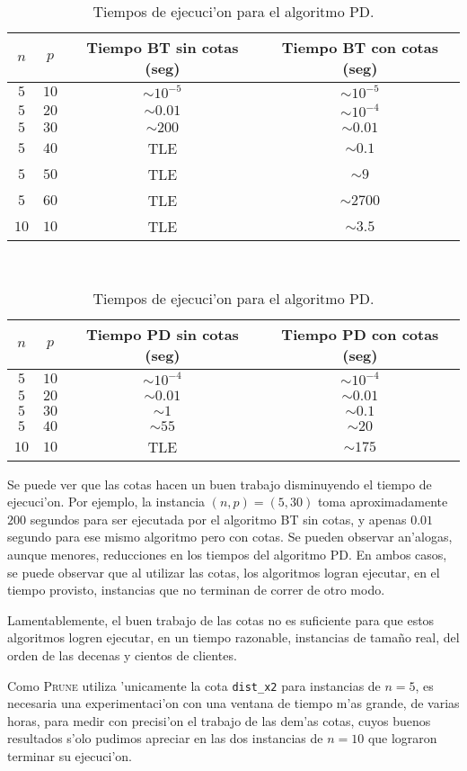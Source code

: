\begin{table}[h]
\centering
\begin{tabular}{|c|c|c|c|}
\hline
$n$ & $p$ & Tiempo BT sin cotas (seg) & Tiempo BT con cotas (seg)\\
\hline
$5$ & $10$ & $\sim 10^{-5}$ & $\sim 10^{-5}$\\
$5$ & $20$ & $\sim 0.01$ & $\sim 10^{-4}$\\
$5$ & $30$ & $\sim 200$ & $\sim 0.01$\\
$5$ & $40$ & TLE & $\sim 0.1$\\
$5$ & $50$ & TLE & $\sim 9$\\
$5$ & $60$ & TLE & $\sim 2700$\\
$10$ & $10$ & TLE & $\sim 3.5$\\
\hline
\end{tabular}
\caption{Tiempos de ejecuci'on para el algoritmo BT.}
\label{ta:tiempos_bt}
\hfill \\
\begin{tabular}{|c|c|c|c|}
\hline
$n$ & $p$ & Tiempo PD sin cotas (seg) & Tiempo PD con cotas (seg)\\
\hline
$5$ & $10$ & $\sim 10^{-4}$ & $\sim 10^{-4}$\\
$5$ & $20$ & $\sim 0.01$ & $\sim 0.01$\\
$5$ & $30$ & $\sim 1$ & $\sim 0.1$\\
$5$ & $40$ & $\sim 55$ & $\sim 20$\\
$10$ & $10$ & TLE & $\sim 175$\\
\hline
\end{tabular}
\caption{Tiempos de ejecuci'on para el algoritmo PD.}
\label{ta:tiempos_dp}
\end{table}

Se puede ver que las cotas hacen un buen trabajo disminuyendo el tiempo de ejecuci'on. Por ejemplo, la instancia $(n, p) = (5, 30)$ toma aproximadamente $200$ segundos para ser ejecutada por el algoritmo BT sin cotas, y apenas $0.01$ segundo para ese mismo algoritmo pero con cotas. Se pueden observar an'alogas, aunque menores, reducciones en los tiempos del algoritmo PD. En ambos casos, se puede observar que al utilizar las cotas, los algoritmos logran ejecutar, en el tiempo provisto, instancias que no terminan de correr de otro modo.

Lamentablemente, el buen trabajo de las cotas no es suficiente para que estos algoritmos logren ejecutar, en un tiempo razonable, instancias de tama\~no real, del orden de las decenas y cientos de clientes.

Como \textsc{Prune} utiliza 'unicamente la cota \texttt{dist\_x2} para instancias de $n = 5$, es necesaria una experimentaci'on con una ventana de tiempo m'as grande, de varias horas, para medir con precisi'on el trabajo de las dem'as cotas, cuyos buenos resultados s'olo pudimos apreciar en las dos instancias de $n = 10$ que lograron terminar su ejecuci'on.